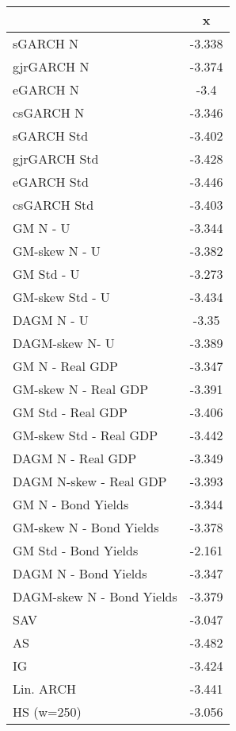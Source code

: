 \documentclass{article}
\begin{document}


\begin{table}[ht]
\centering
\begin{tabular}{lc}
  \hline
 & x \\ 
  \hline
sGARCH N & -3.338 \\ 
  gjrGARCH N & -3.374 \\ 
  eGARCH N & -3.4 \\ 
  csGARCH N & -3.346 \\ 
  sGARCH Std & -3.402 \\ 
  gjrGARCH Std & -3.428 \\ 
  eGARCH Std & -3.446 \\ 
  csGARCH Std & -3.403 \\ 
  GM N - U & -3.344 \\ 
  GM-skew N - U & -3.382 \\ 
  GM Std - U & -3.273 \\ 
  GM-skew Std - U & -3.434 \\ 
  DAGM N - U & -3.35 \\ 
  DAGM-skew  N- U & -3.389 \\ 
  GM N - Real GDP & -3.347 \\ 
  GM-skew N - Real GDP & -3.391 \\ 
  GM Std - Real GDP & -3.406 \\ 
  GM-skew Std - Real GDP & -3.442 \\ 
  DAGM N - Real GDP & -3.349 \\ 
  DAGM N-skew - Real GDP & -3.393 \\ 
  GM N - Bond Yields & -3.344 \\ 
  GM-skew N - Bond Yields & -3.378 \\ 
  GM Std - Bond Yields & -2.161 \\ 
  DAGM N - Bond Yields & -3.347 \\ 
  DAGM-skew N - Bond Yields & -3.379 \\ 
  SAV & -3.047 \\ 
  AS & -3.482 \\ 
  IG & -3.424 \\ 
  Lin. ARCH & -3.441 \\ 
  HS (w=250) & -3.056 \\ 
   \hline
\end{tabular}
\end{table}
\end{document}

